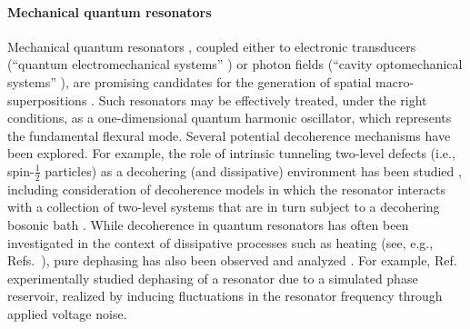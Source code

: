 \documentclass[3p,sort&compress,12pt]{elsarticle}
\begin{document}
\paragraph{Mechanical quantum resonators} Mechanical quantum resonators \cite{Aspelmeyer:2013:aa,Poot:2012:aa,Greenberg:2012:zz,Blencowe:2004:mm}, coupled either to electronic transducers (``quantum electromechanical systems'' \cite{Blencowe:2004:mm,Poot:2012:aa,Greenberg:2012:zz}) or photon fields (``cavity optomechanical systems'' \cite{Aspelmeyer:2013:aa}), are promising candidates for the generation of spatial macro-superpositions \cite{Arndt:2014:oo}. Such resonators may be effectively treated, under the right conditions, as a one-dimensional quantum harmonic oscillator, which represents the fundamental flexural mode.  Several potential decoherence mechanisms have been explored. For example, the role of intrinsic tunneling two-level defects (i.e., spin-$\frac{1}{2}$ particles) as a decohering (and dissipative) environment has been studied \cite{Mohanty:2002:mm,Ahn:2003:mt,Blencowe:2004:mm,Blencowe:2005:cc,Zolfagharkhani:2005:tv,Seoanez:2006:yb,Seoanez:2007:um,Remus:2009:im,Schlosshauer:2008:os,Aspelmeyer:2013:aa}, including consideration of decoherence models in which the resonator interacts with a collection of two-level systems that are in turn subject to a decohering bosonic bath \cite{Schlosshauer:2008:os,Remus:2009:im}. While decoherence in quantum resonators has often been investigated in the context of dissipative processes such as heating (see, e.g., Refs.~\cite{Mohanty:2002:mm,Ahn:2003:mt,Zolfagharkhani:2005:tv,Seoanez:2006:yb,Seoanez:2007:um,Aspelmeyer:2013:aa}), pure dephasing has also been observed and analyzed \cite{Fong:2012:aa,Zhang:2014:oo,Miao:2014:ii,Moser:2014:uu,Maillet:2016:zz}. For example, Ref.~\cite{Maillet:2016:zz} experimentally studied dephasing of a resonator due to a simulated phase reservoir, realized by inducing fluctuations in the resonator frequency through applied voltage noise. 
 
\end{document}
